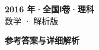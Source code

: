 \documentclass[zihao=-4, a4paper]{ctexart}
\begin{document}
\begin{center}
  {\Large\bfseries 2016 年·全国Ⅰ卷·理科}\\[4pt]
  {\large 数学 · 解析版}
\end{center}
\medskip
{}

\clearpage
{}
\begin{center}{\Large\bfseries 参考答案与详细解析}\end{center}
\medskip

\end{document}
